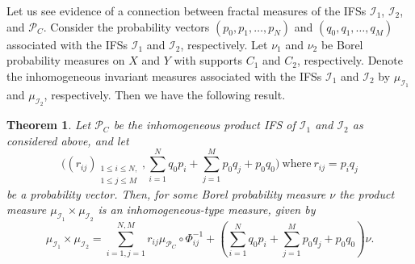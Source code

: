\documentclass[12pt,oneside,reqno]{amsart}
\newtheorem{theorem}{Theorem}[section]
\theoremstyle{definition}
\theoremstyle{remark}
\begin{document}
Let us see evidence of a connection between fractal measures of the IFSs $\mathcal{I}_1$, $\mathcal{I}_2$, and  $\mathcal{P}_C.$ 
Consider the probability vectors $(p_0, p_1, \ldots, p_N)$ and $(q_0, q_1, \ldots, q_M)$ associated with the IFSs $\mathcal{I}_1$ and $\mathcal{I}_2$, respectively.
Let $\nu_1$ and $\nu_2$ be Borel probability measures on $X$ and $Y$ with supports $C_1$ and $C_2$, respectively. Denote the inhomogeneous invariant measures associated with the IFSs $\mathcal{I}_1$ and $\mathcal{I}_2$ by $\mu_{\mathcal{I}_1}$ and $\mu_{\mathcal{I}_2}$, respectively. Then we have the following result.
\begin{theorem}
    Let $\mathcal{P}_C$ be the inhomogeneous product IFS of $\mathcal{I}_1$ and $\mathcal{I}_2$ as considered above, and let
    \[
\bigg((r_{ij})_{\substack{1\le i\le N,\\ 1\le j\le M}}, \sum_{i=1}^N q_0 p_i+ \sum_{j=1}^M p_0 q_j+ p_0 q_0\bigg) ~\text{where}~ r_{ij} = p_i q_j
\]
be a probability vector. Then, for some Borel probability measure $\nu$ the product measure $\mu_{\mathcal{I}_1} \times \mu_{\mathcal{I}_2}$ is an inhomogeneous-type measure, given by
\[
\mu_{\mathcal{I}_1} \times \mu_{\mathcal{I}_2} = \sum_{i=1,j=1}^{N,M} r_{ij} \mu_{\mathcal{P}_C} \circ \Phi_{ij}^{-1} + \left( \sum_{i=1}^N q_0 p_i + \sum_{j=1}^M p_0 q_j + p_0 q_0 \right) \nu.
\] 
\end{theorem}
\end{document}
